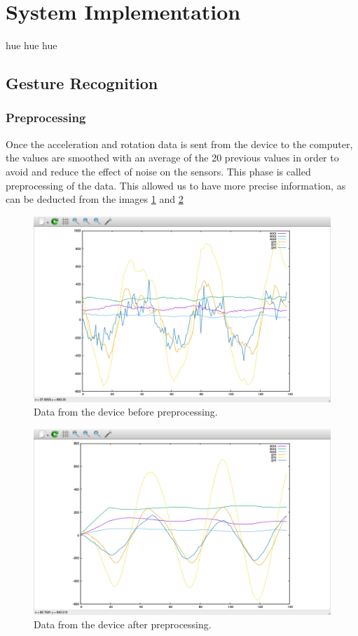 \section{System Implementation} 
hue hue hue

\subsection{Gesture Recognition}
\subsubsection{Preprocessing}
Once the acceleration and rotation data is sent from the device to the computer,
 the values are smoothed with an average of the 20 previous values in order to avoid and reduce the effect of noise on the sensors.
 This phase is called preprocessing of the data. 
 This allowed us to have more precise information, as can be deducted from the images  \ref{fig:figure2} and \ref{fig:figure3}

\begin{figure}[!h]
\centering
\includegraphics[width=0.9\columnwidth]{img/raw}
\caption{Data from the device before preprocessing.}
\label{fig:figure2}
\end{figure}

\begin{figure}[!h]
\centering
\includegraphics[width=0.9\columnwidth]{img/20}
\caption{Data from the device after preprocessing.}
\label{fig:figure3}
\end{figure}


